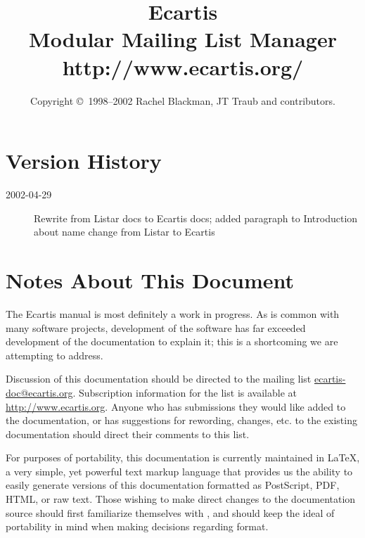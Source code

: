 \documentclass{book}
\begin{document}
\frontmatter

\title{Ecartis \\ Modular Mailing List Manager \\ http://www.ecartis.org/}
\author{Copyright \copyright\ 1998--2002 Rachel Blackman, JT Traub and contributors.}
\maketitle

\chapter{Version History}
\label{version}

\begin{description}
	\item[2002-04-29] Rewrite from Listar docs to Ecartis docs; added
                      paragraph to Introduction about name change from Listar
                      to Ecartis
\end{description}

\chapter{Notes About This Document}

The Ecartis manual is most definitely a work in progress.  As is common with
many software projects, development of the software has far exceeded
development of the documentation to explain it; this is a shortcoming we are
attempting to address.  

Discussion of this documentation should be directed to the mailing list 
\href{ecartis-doc@ecartis.org}{ecartis-doc@ecartis.org}.  Subscription information for the list is
available at \href{http://www.ecartis.org}{http://www.ecartis.org}.  Anyone who has submissions they
would like added to the documentation, or has suggestions for rewording,
changes, etc. to the existing documentation should direct their comments to
this list.

For purposes of portability, this documentation is currently maintained in
\LaTeX, a very simple, yet powerful text markup language that provides us the
ability to easily generate versions of this documentation formatted as
PostScript, PDF, HTML, or raw text.  Those wishing to make direct changes to
the documentation source should first familiarize themselves with \LaTeXe,
and should keep the ideal of portability in mind when making decisions
regarding format.
\end{document}
